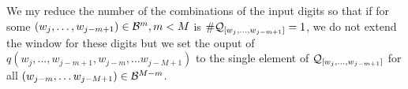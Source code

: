 We my reduce the number of the combinations of the input digits so that if for some $(w_j,\dots, w_{j-m+1})\in\mathcal{B}^m, m<M$ is  $\#\mathcal{Q}_{[w_j,\dots, w_{j-m+1}]}=1$, we do not extend the window for these digits but we set the ouput of $q(w_j,\dots, w_{j-m+1}, w_{j-m}, \dots w_{j-M+1})$ to the single element of $\mathcal{Q}_{[w_j,\dots, w_{j-m+1}]}$ for all $(w_{j-m}, \dots w_{j-M+1})\in \mathcal{B}^{M-m}$. 

















